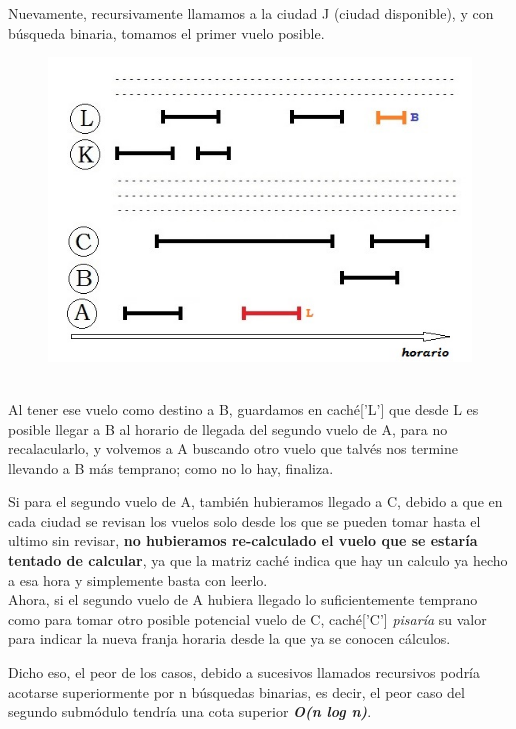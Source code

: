 \documentclass[10pt,a4paper]{article}
\begin{document}
Nuevamente, recursivamente llamamos a la ciudad J (ciudad disponible), y con búsqueda binaria, tomamos el primer vuelo posible.
\begin{figure}[h]
	\begin{center}
	   \includegraphics[scale=0.50]{imagenes/demo8.jpg}
	\end{center}
\end{figure}\\
Al tener ese vuelo como destino a B, guardamos en caché['L'] que desde L es posible llegar a B al horario de llegada del segundo vuelo de A, para no recalacularlo, y volvemos a A buscando otro vuelo que talvés nos termine llevando a B más temprano; como no lo hay, finaliza.

Si para el segundo vuelo de A, también hubieramos llegado a C, debido a que en cada ciudad se revisan los vuelos solo desde los que se pueden tomar hasta el ultimo sin revisar, \textbf{no hubieramos re-calculado el vuelo que se estaría tentado de calcular}, ya que la matriz caché indica que hay un calculo ya hecho a esa hora y simplemente basta con leerlo.\\
Ahora, si el segundo vuelo de A hubiera llegado lo suficientemente temprano como para tomar otro posible potencial vuelo de C,     caché['C'] \textit{pisaría} su valor para indicar la nueva franja horaria desde la que ya se conocen cálculos. 

Dicho eso, el peor de los casos, debido a sucesivos llamados recursivos podría acotarse superiormente por n búsquedas binarias, es decir, el peor caso del segundo submódulo tendría una cota superior \textbf{\textit{ O(n log n)}}.
\end{document}
